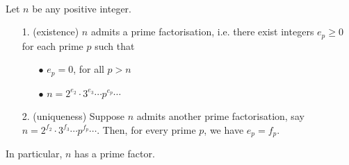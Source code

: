 \vspace*{1em}

\begin{theorem}\label{fundarith}
\hfill\\[0.2em]
Let $n$ be any positive integer.
\begin{itemize}
\item[1.] (existence) $n$ admits a prime factorisation, i.e. there exist integers $e_p \geq 0$ for each prime $p$ such that 
\begin{itemize}
\item[$\bullet$] $e_p = 0$, for all $p > n$
\item[$\bullet$] $n = 2^{e_2}\cdot 3^{e_3}\cdots p^{e_p}\cdots$
\end{itemize}
\item[2.] (uniqueness) Suppose $n$ admits another prime factorisation, say $n = 2^{f_2}\cdot 3^{f_3}\cdots p^{f_p}\cdots$. Then, for every prime $p$, we have $e_p = f_p$.
\end{itemize}
In particular, $n$ has a prime factor.
\end{theorem}
